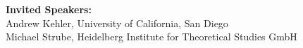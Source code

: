 \documentclass[11pt]{article}
\begin{document}
\begin{description}
\vspace{3mm}

\item{\bf Invited Speakers:}\vspace{2mm} \\
Andrew Kehler, University of California, San Diego \\
Michael Strube, Heidelberg Institute for Theoretical Studies GmbH



\end{description}
\end{document}
